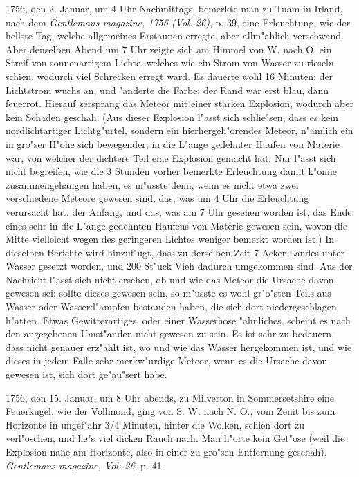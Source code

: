 \documentclass[a4paper, 11pt, oneside, polutonikogreek, german]{article}
\begin{document}
1756, den 2. Januar, um 4 Uhr Nachmittags, bemerkte man zu Tuam in Irland, nach dem \emph{Gentlemans magazine, 1756 (Vol. 26)}, p. 39, eine Erleuchtung, wie der hellste Tag, welche allgemeines Erstaunen erregte, aber allm"ahlich verschwand. Aber denselben Abend um 7 Uhr zeigte sich am Himmel von W. nach O. ein Streif von sonnenartigem Lichte, welches wie ein Strom von Wasser zu rieseln schien, wodurch viel Schrecken erregt ward. Es dauerte wohl 16 Minuten; der Lichtstrom wuchs an, und "anderte die Farbe; der Rand war erst blau, dann feuerrot. Hierauf zersprang das Meteor mit einer starken Explosion, wodurch aber kein Schaden geschah. (Aus dieser Explosion l"asst sich schlie"sen, dass es kein nordlichtartiger Lichtg"urtel, sondern ein hierhergeh"orendes Meteor, n"amlich ein in gro"ser H"ohe sich bewegender, in die L"ange gedehnter Haufen von Materie war, von welcher der dichtere Teil eine Explosion gemacht hat. Nur l"asst sich nicht begreifen, wie die 3 Stunden vorher bemerkte Erleuchtung damit k"onne zusammengehangen haben, es m"usste denn, wenn es nicht etwa zwei verschiedene Meteore gewesen sind, das, was um 4 Uhr die Erleuchtung verursacht hat, der Anfang, und das, was am 7 Uhr gesehen worden ist, das Ende eines sehr in die L"ange gedehnten Haufens von Materie gewesen sein, wovon die Mitte vielleicht wegen des geringeren Lichtes weniger bemerkt worden ist.) In dieselben Berichte wird hinzuf"ugt, dass zu derselben Zeit 7 Acker Landes unter Wasser gesetzt worden, und 200 St"uck Vieh dadurch umgekommen sind. Aus der Nachricht l"asst sich nicht ersehen, ob und wie das Meteor die Ursache davon gewesen sei; sollte dieses gewesen sein, so m"usste es wohl gr"o"sten Teils aus Wasser oder Wasserd"ampfen bestanden haben, die sich dort niedergeschlagen h"atten. Etwas Gewitterartiges, oder einer Wasserhose "ahnliches, scheint es nach den angegebenen Umst"anden nicht gewesen zu sein. Es ist sehr zu bedauern, dass nicht genauer erz"ahlt ist, wo und wie das Wasser hergekommen ist, und wie dieses in jedem Falle sehr merkw"urdige Meteor, wenn es die Ursache davon gewesen ist, sich dort ge"au"sert habe.

1756, den 15. Januar, um 8 Uhr abends, zu Milverton in Sommersetshire eine Feuerkugel, wie der Vollmond, ging von S. W. nach N. O., vom Zenit bis zum Horizonte in ungef"ahr 3/4 Minuten, hinter die Wolken, schien dort zu verl"oschen, und lie"s viel dicken Rauch nach. Man h"orte kein Get"ose (weil die Explosion nahe am Horizonte, also in einer zu gro"sen Entfernung geschah). \emph{Gentlemans magazine, Vol. 26}, p. 41.
\end{document}
